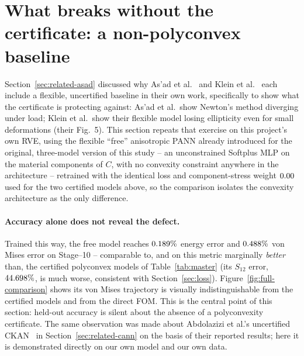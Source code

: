 \documentclass[10pt,a4paper]{article}
\begin{document}
\section{What breaks without the certificate: a non-polyconvex baseline}
\label{sec:non-polyconvex}
Section~\ref{sec:related-asad} discussed why As'ad et al.~\cite{Asad2022}
and Klein et al.~\cite{Klein2022} each include a flexible, uncertified
baseline in their own work, specifically to show what the certificate is
protecting against: As'ad et al.\ show Newton's method diverging under
load; Klein et al.\ show their flexible model losing ellipticity even for
small deformations (their Fig.~5). This section repeats that exercise on
this project's own RVE, using the flexible ``free'' anisotropic PANN
already introduced for the original, three-model version of this study --
an unconstrained Softplus MLP on the material components of $C$, with no
convexity constraint anywhere in the architecture -- retrained with the
identical loss and component-stress weight $0.00{}$ used
for the two certified models above, so the comparison isolates the
convexity architecture as the only difference.

\paragraph{Accuracy alone does not reveal the defect.} Trained this way,
the free model reaches $0.189\%$ energy error and
$0.488\%{}$ von Mises error on Stage--10 -- comparable
to, and on this metric marginally \emph{better} than, the certified
polyconvex models of Table~\ref{tab:master} (its $S_{12}$ error,
$44.698\%$, is much worse, consistent with
Section~\ref{sec:loss}). Figure~\ref{fig:full-comparison} shows its von
Mises trajectory is visually indistinguishable from the certified models
and from the direct FOM. This is the central point of this section: held-out
accuracy is silent about the absence of a polyconvexity certificate. The
same observation was made about Abdolazizi et al.'s uncertified
CKAN~\cite{Abdolazizi2025} in Section~\ref{sec:related-cann} on the basis
of their reported results; here it is demonstrated directly on our own
model and our own data.
\end{document}
